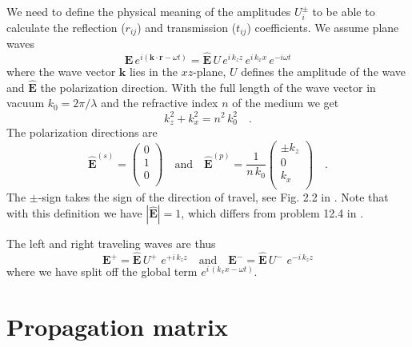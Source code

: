 We need to define the physical meaning of the amplitudes $U_i^\pm$ to be able to calculate the reflection ($r_{ij}$) and transmission ($t_{ij}$) coefficients. We assume plane waves 
\begin{equation}
\mathbf{E} \, e^{i (\mathbf{k}  \cdot \mathbf{r} - \omega t)}
=
\mathbf{\hat{E}} \, U \, e^{i \, k_z z} \, e^{i \, k_x x} \, e^{-i \omega t}
\end{equation}
where the wave vector $\mathbf{k} $ lies in the $xz$-plane, $U$ defines the amplitude of the wave and $\mathbf{\hat{E}} $  the polarization direction.
With   the full length of the wave vector in vacuum $k_0 = 2 \pi / \lambda$ and the refractive index $n$ of the medium we get
\begin{equation}
k_{z}^2 + k_{x}^2  = n^2 \, k_0^2  \quad . 
\end{equation}
The polarization directions are
\begin{equation}
\mathbf{\hat{E}}^{(s)} = \begin{pmatrix}
 0 \\ 1 \\ 0 \\
\end{pmatrix}
\quad 
\text{and}
\quad
\mathbf{\hat{E}}^{(p)} =\frac{1}{n \, k_0} \begin{pmatrix}
\pm k_z \\ 0 \\  k_x  \\
\end{pmatrix} \quad . \label{eq:6_Esp_def}
\end{equation}
The $\pm$-sign takes the sign of the direction of travel, see Fig. 2.2 in \cite{Novotny-Hecht2012}. Note that with this definition we have $|\mathbf{\hat{E}}| = 1$, which differs from problem 12.4 in \cite{Novotny-Hecht2012}.

The left and right traveling waves are thus
\begin{equation}
\mathbf{E}^+ = \mathbf{\hat{E}} \, U^+ \, \, e^{+ i \, k_z z}
\quad
\text{and}
\quad
\mathbf{E}^- = \mathbf{\hat{E}} \, U^- \, \, e^{- i \, k_z z}
\end{equation}
where we have split off the global term $ e^{i \, ( k_x x - \omega t)}$.

\section{Propagation matrix}


